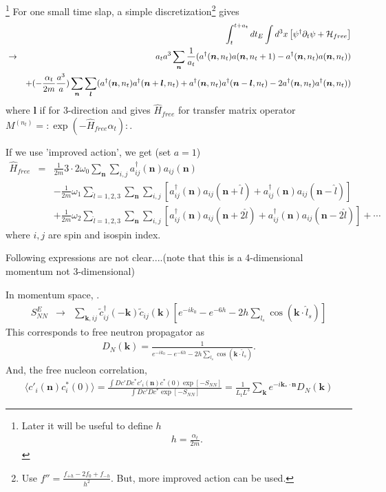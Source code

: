 \documentclass[10pt]{book}
\def\bm{\boldsymbol}
\newcommand{\bea}{\begin{eqnarray}}
\newcommand{\eea}{\end{eqnarray}}
\newcommand{\no}{\nonumber \\}
\newcommand{\del}{\partial}
\def\vk{{\bm k}}
\def\vn{{\bm n}}
\def\la{\langle}
\def\ra{\rangle}
\begin{document}
\footnote{ Later it will be useful to define $h$
\bea 
h=\frac{\alpha_t}{2m}.
\eea 
}
For one small time slap, a simple discretization\footnote{
Use $f''=\frac{f_{+h}-2f_0+f_{-h}}{h^2}$. But, more improved action can be used.
} gives
\bea 
& &\int_{t}^{t+a_t} dt_E \int d^3 x\left[ \psi^\dagger \del_t\psi +{\cal H}_{free} \right] \no 
&\to& a_t a^3\sum_{\bm n} \frac{1}{a_t}(a^\dagger({\bm n},n_t)a({\bm n},n_t+1)-a^\dagger({\bm n},n_t)a({\bm n},n_t))
      \no 
& & +(-\frac{\alpha_t}{2m}\frac{a^3}{a}) \sum_{\bm n}\sum_{\bm l}
    (a^\dagger({\bm n},n_t)a^\dagger({\bm n}+{\bm l},n_t)
    +a^\dagger({\bm n},n_t)a^\dagger({\bm n}-{\bm l},n_t)
    -2a^\dagger({\bm n},n_t)a^\dagger({\bm n},n_t)) \nonumber 
\eea 
where ${\bm l}$ if for 3-direction and gives $\hat{H}_{free}$ for transfer matrix operator 
$M^{(n_t)}=:\exp(-\hat{H}_{free}\alpha_t):$.

If we use 'improved action', we get (set $a=1$)
\bea 
\hat{H}_{free}&=&\frac{1}{2m} 3\cdot 2 \omega_0 \sum_{\vn}\sum_{i,j} a^\dagger_{ij}(\vn) a_{ij}(\vn)\no 
        & &-\frac{1}{2m} \omega_1 \sum_{\hat{l}=1,2,3}\sum_{\vn}\sum_{i,j}
                  [a^\dagger_{ij}(\vn) a_{ij}(\vn+\hat{l})
                  +a^\dagger_{ij}(\vn) a_{ij}(\vn-\hat{l})]\no 
        & &+\frac{1}{2m} \omega_2 \sum_{\hat{l}=1,2,3}\sum_{\vn}\sum_{i,j}
                          [a^\dagger_{ij}(\vn) a_{ij}(\vn+2\hat{l})
                          +a^\dagger_{ij}(\vn) a_{ij}(\vn-2\hat{l})]+\cdots           
\eea 
where $i,j$ are spin and isospin index. 

{\color{red} Following expressions are not clear....(note that this is a 4-dimensional momentum not 3-dimensional)}

In momentum space, .
\bea 
S^E_{NN}&\to& \sum_{\vk,ij} 
\tilde{c}^\dagger_{ij}(-\vk)\tilde{c}_{ij}(\vk)
[e^{-ik_0}
-e^{-6h}-2 h \sum_{l_s}\cos(\vk\cdot\hat{l}_s)] 
\eea 
This corresponds to free neutron propagator as
\bea 
D_N(\vk)=\frac{1}{ e^{-ik_0}
	-e^{-6h}-2 h \sum_{l_s}\cos(\vk\cdot\hat{l}_s)}.
\eea 
And, the free nucleon correlation,
\bea 
\la c'_i(\vn)c^*_i(0) \ra 
=\frac{\int Dc' D c^* c'_i(\vn) c^*(0) \exp[-S_{NN}]}
{\int Dc' D c^* \exp[-S_{NN}]}
=\frac{1}{L_t L^3} \sum_{\vk}e^{-i\vk_*\cdot\vn} D_N(\vk)
\eea
\end{document}

